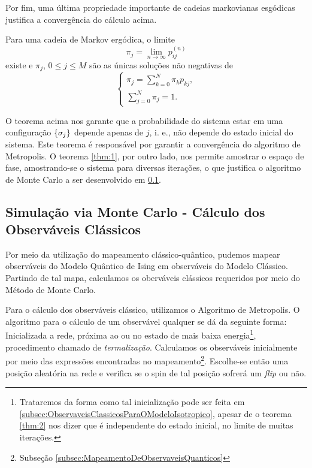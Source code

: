 Por fim, uma última propriedade importante de cadeias markovianas esgódicas justifica a convergência do cálculo acima. 

\begin{theorem}
	Para uma cadeia de Markov ergódica, o limite
	\begin{equation*}
		\pi_j = \lim_{n \to \infty} p^{(n)}_{ij}
	\end{equation*}
	existe e $\pi_j$, $0 \leq j \leq M$ são as únicas soluções não negativas de 
	\begin{equation*}
		\begin{cases*}
			\pi_j = \sum_{k=0}^N \pi_k p_{kj}, \\
			\sum_{j=0}^N \pi_j = 1.
		\end{cases*}
	\end{equation*}
	\label{thm:2}
\end{theorem}

O teorema acima nos garante que a probabilidade do sistema estar em uma configuração $\{ \sigma_j \}$ depende apenas de $j$, i. e., não depende do estado inicial do sistema. Este teorema é responsável por garantir a convergência do algoritmo de Metropolis. O teorema \ref{thm:1}, por outro lado, nos permite amostrar o espaço de fase, amostrando-se o sistema para diversas iterações, o que justifica o algoritmo de Monte Carlo a ser desenvolvido em \ref{subsec:SimulacaoCalculoDosObservaveisClassicos}. 



\subsection{Simulação via Monte Carlo - Cálculo dos Observáveis Clássicos}
\label{subsec:SimulacaoCalculoDosObservaveisClassicos}
Por meio da utilização do mapeamento clássico-quântico, pudemos mapear observáveis do Modelo Quântico de Ising em observáveis do Modelo Clássico. Partindo de tal mapa, calculamos os oberváveis clássicos requeridos por meio do Método de Monte Carlo. 

Para o cálculo dos observáveis clássico, utilizamos o Algoritmo de Metropolis. O algoritmo para o cálculo de um observável qualquer se dá da seguinte forma: Inicializada a rede, próxima  ao ou no estado de mais baixa energia\footnote{Trataremos da forma como tal inicialização pode ser feita em \ref{subsec:ObservaveisClassicosParaOModeloIsotropico}, apesar de o teorema \ref{thm:2} nos dizer que é independente do estado inicial, no limite de muitas iterações.}, procedimento chamado de \textit{termalização}. Calculamos os observáveis inicialmente por meio das expressões encontradas no mapeamento\footnote{Subseção \ref{subsec:MapeamentoDeObservaveisQuanticos}}. Escolhe-se então uma posição aleatória na rede e verifica se o spin de tal posição sofrerá um \textit{flip} ou não. 

